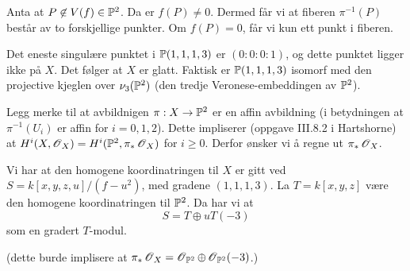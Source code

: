 \documentclass[11pt, norsk]{article}
\begin{document}
Anta at $P \not \in V(f) \in \mathbb{P}^2$. Da er $f(P) \neq 0$. Dermed får vi at fiberen $\pi^{-1}(P)$ består av to forskjellige punkter. Om $f(P)=0$, får vi kun ett punkt i fiberen.

Det eneste singulære punktet i $\mathbb{P}(1,1,1,3)$ er $(0:0:0:1)$, og dette punktet ligger ikke på $X$. Det følger at $X$ er glatt. Faktisk er $\mathbb{P}(1,1,1,3)$ isomorf med den projective kjeglen over $\nu_3(\mathbb{P}^2)$ (den tredje Veronese-embeddingen av $\mathbb{P}^2$).

Legg merke til at avbildnigen $\pi:X \to \mathbb{P}^2$ er en affin avbildning (i betydningen at $\pi^{-1}(U_i)$ er affin for $i=0,1,2$). Dette impliserer (oppgave III.8.2 i Hartshorne) at $H^i(X,\operatorname{\mathscr{O}}_X) = H^i(\mathbb{P}^2,\pi_\ast \operatorname{\mathscr{O}}_X)$ for $i \geq 0$. Derfor ønsker vi å regne ut $\pi_\ast \operatorname{\mathscr{O}}_X$.

Vi har at den homogene koordinatringen til $X$ er gitt ved $S = k[x,y,z,u]/(f-u^2)$, med gradene $(1,1,1,3)$. La $T=k[x,y,z]$ være den homogene koordinatringen til $\mathbb{P}^2$. Da har vi at
$$
S = T \oplus u T (-3)
$$
som en gradert $T$-modul. 

(dette burde implisere at $\pi_\ast \operatorname{\mathscr{O}}_X = \operatorname{\mathscr{O}}_{\mathbb{P}^2} \oplus \operatorname{\mathscr{O}}_{\mathbb{P}^2}(-3)$.)
\end{document}
